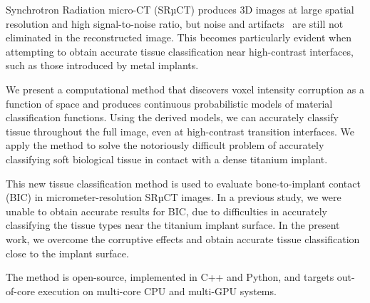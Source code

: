 Synchrotron Radiation micro-CT (SRµCT) produces 3D images at large spatial
resolution and high signal-to-noise ratio, but noise and
artifacts~\cite{adv_in_srmicroct} are still not eliminated in the reconstructed
image. This becomes particularly evident when attempting to obtain accurate
tissue classification near high-contrast interfaces, such as those introduced
by metal implants.

We present a computational method that discovers voxel intensity corruption as
a function of space and produces continuous probabilistic models of material
classification functions. Using the derived models, we can accurately classify
tissue throughout the full image, even at high-contrast transition interfaces.
We apply the method to solve the notoriously difficult problem of accurately
classifying soft biological tissue in contact with a dense titanium implant.

This new tissue classification method is used to evaluate bone-to-implant
contact (BIC) in micrometer-resolution SRµCT images. In a previous study, we
were unable to obtain accurate results for BIC, due to difficulties in
accurately classifying the tissue types near the titanium implant surface. In
the present work, we overcome the corruptive effects and obtain accurate tissue
classification close to the implant surface.

The method is open-source, implemented in C++ and Python, and targets
out-of-core execution on multi-core CPU and multi-GPU systems.

